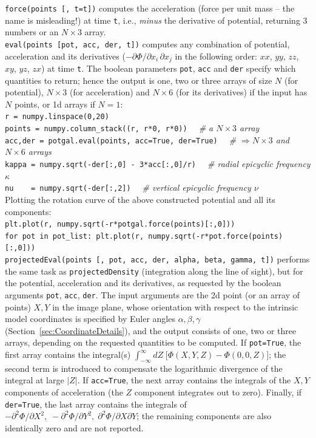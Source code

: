 \documentclass[12pt]{article}
\begin{document}
\texttt{force(points [, t=t])} computes the acceleration (force per unit mass -- the name is misleading!) at time \texttt{t}, i.e., \textit{minus} the derivative of potential, returning 3 numbers or an $N\times3$ array.\\[2mm]
\texttt{eval(points [pot, acc, der, t])} computes any combination of potential, acceleration and its derivatives ($-\partial \Phi / \partial x_i\,\partial x_j$ in the following order: $xx$, $yy$, $zz$, $xy$, $yz$, $zx$) at time \texttt{t}. The boolean parameters \texttt{pot}, \texttt{acc} and \texttt{der} specify which quantities to return; hence the output is one, two or three arrays of size $N$ (for potential), $N\times3$ (for acceleration) and $N\times6$ (for its derivatives) if the input has $N$ points, or 1d arrays if $N=1$:\\[1mm]
\texttt{r = numpy.linspace(0,20)}\\
\texttt{points = numpy.column_stack((r, r*0, r*0))}
\textit{\color{Sepia} \ \ \# a $N\times3$ array}\\
\texttt{acc,der = potgal.eval(points, acc=True, der=True)}
\textit{\color{Sepia} \ \ \# $\Rightarrow N\times3$ and $N\times6$ arrays} \\
\texttt{kappa = numpy.sqrt(-der[:,0] - 3*acc[:,0]/r)}
\textit{\color{Sepia} \ \ \# radial epicyclic frequency $\kappa$} \\
\texttt{nu~~~~= numpy.sqrt(-der[:,2])}
\textit{\color{Sepia} \ \ \# vertical epicyclic frequency $\nu$} \\[1mm]
Plotting the rotation curve of the above constructed potential and all its components:\\
\texttt{plt.plot(r, numpy.sqrt(-r*potgal.force(points)[:,0]))}\\
\texttt{for pot in pot_list: plt.plot(r, numpy.sqrt(-r*pot.force(points)[:,0]))}\\[2mm]
\texttt{projectedEval(points [, pot, acc, der, alpha, beta, gamma, t])} performs the same task as \texttt{projectedDensity} (integration along the line of sight), but for the potential, acceleration and its derivatives, as requested by the boolean arguments \texttt{pot}, \texttt{acc}, \texttt{der}. The input arguments are the 2d point (or an array of points) $X,Y$ in the image plane, whose orientation with respect to the intrinsic model coordinates is specified by Euler angles $\alpha, \beta, \gamma$ (Section~\ref{sec:CoordinateDetails}), and the output consists of one, two or three arrays, depending on the requested quantities to be computed. If \texttt{pot=True}, the first array contains the integral(s) $\int_{-\infty}^{\infty} dZ\; \big[\Phi(X,Y,Z)-\Phi(0,0,Z)]$; the second term is introduced to compensate the logarithmic divergence of the integral at large $|Z|$. If \texttt{acc=True}, the next array contains the integrals of the $X,Y$ components of acceleration (the $Z$ component integrates out to zero). Finally, if \texttt{der=True}, the last array contains the integrals of $-\partial^2 \Phi / \partial X^2,\; -\partial^2 \Phi / \partial Y^2,\; \partial^2 \Phi / \partial X \partial Y$; the remaining components are also identically zero and are not reported.\\[2mm]
\end{document}
